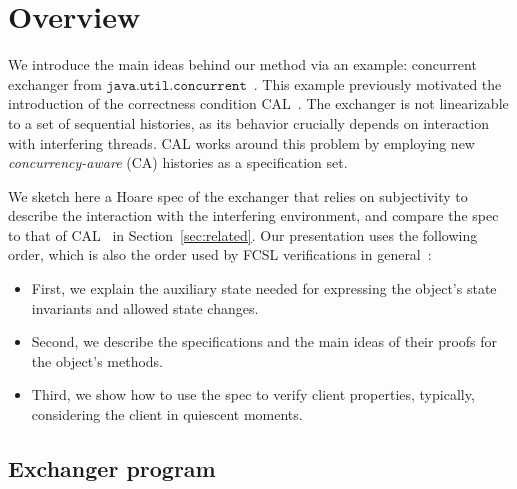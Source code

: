 \section{Overview}
\label{sec:overview}


We introduce the main ideas behind our method via an example:
concurrent exchanger from
$\mathtt{java.util.concurrent}$~\cite{Scherer-al:SCOOL05,ExchangerClass}. This
example previously motivated the introduction of the correctness
condition CAL~\cite{Hemed-Rinetzky:PODC14}. The exchanger is not
linearizable to a set of sequential histories, as its behavior
crucially depends on interaction with interfering threads.
%
CAL works around this problem by employing new
\emph{concurrency-aware} (CA) histories as a specification set.

We sketch here a Hoare spec of the exchanger that relies on
subjectivity to describe the interaction with the interfering
environment, and compare the spec to that of
CAL~\cite{Hemed-al:DISC15} in Section~\ref{sec:related}.  Our
presentation uses the following order, which is also the order used by
FCSL verifications in general~\cite{Sergey-al:PLDI15}: 


\begin{itemize}

\item First, we explain the auxiliary state needed for expressing the
  object's state invariants and allowed state changes. 

\item Second, we describe the specifications and the main ideas of
  their proofs for the object's methods.

\item Third, we show how to use the spec to verify client properties,
  typically, considering the client in quiescent moments.

\end{itemize}


\subsection{Exchanger program} 
\label{sec:exchanger}

\newcommand{\Unmatched}{{\mathsf{U}}}
\newcommand{\Matched}[1]{{\mathsf{M}\ #1}}
\newcommand{\Retired}{{\mathsf{R}}}


